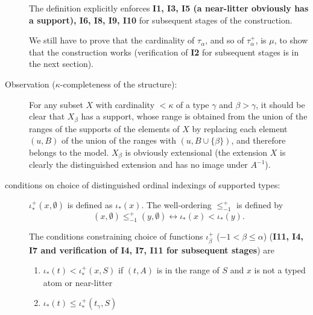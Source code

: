\documentclass[112pt]{article}
\begin{document}
\begin{description}
The definition explicitly enforces {\bf I1, I3, I5 (a near-litter obviously has a support), I6, I8, I9, I10} for subsequent stages of the construction.

We still have to prove that the cardinality of $\tau_\alpha$, and so of $\tau^+_\alpha$, is $\mu$, to show that the construction works (verification of {\bf I2} for subsequent stages is in the next section).

\item[Observation ($\kappa$-completeness of the structure):]  For any subset $X$ with cardinality $<\kappa$ of a type $\gamma$ and $\beta>\gamma$, it should be clear that $X_\beta$ has a support, whose range is obtained from the union of the ranges of the supports of the elements of $X$  by replacing each element $(u,B)$ of the union of the ranges  with $(u,B \cup \{\beta\})$, and therefore belongs to the model.  $X_\beta$ is obviously extensional (the extension $X$ is clearly the distinguished extension and has no image under $A^{-1}$).

\item[conditions on choice of distinguished ordinal indexings of supported types:]  

$\iota_*^+(x,\emptyset)$ is defined as $\iota_*(x)$.
The well-ordering $\leq_{-1}^+$ is defined by $$(x,\emptyset) \leq_{-1}^+ (y,\emptyset) \leftrightarrow \iota_*(x) < \iota_*(y).$$

\begin{comment}

The well-ordering $\leq_\alpha^+$ of $\tau_\alpha^+$ ($\alpha \in \lambda$) must satisfy the condition that for each $(x,S) \in \tau_\alpha^+$, for each $(z,A) \in {\tt rng}(S)$ and litter $L = f_{\beta,\gamma}(y,T)$ with $\beta<\alpha$,  where $L$  meets $z$, $\iota_*^+(y,T) < \iota_*^+(x,S)$ must hold.

\end{comment}

The conditions constraining choice of functions $\iota^+_\beta$ ($-1 < \beta \leq \alpha$) ({\bf I11, I4, I7 and verification of {\bf I4, I7, I11} for subsequent stages}) are

\begin{enumerate}

\item $\iota_*(t) < \iota^+_*(x,S)$ if $(t,A)$ is in the range of $S$ and $x$ is not a typed atom or near-litter

\item $\iota_*(t) \leq \iota^+_*(t_\gamma,S)$


\end{enumerate}
\end{description}
\end{document}
